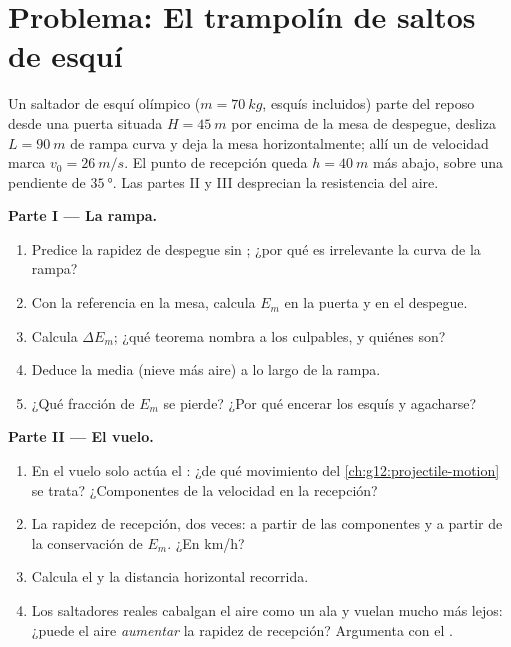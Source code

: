 \section{Problema: El trampolín de saltos de esquí}

\begin{problem}
\label{pb:g12:work-and-energy:1}
Un saltador de esquí olímpico ($m = \qty{70}{kg}$, esquís incluidos) parte del reposo
desde una puerta situada $H = \qty{45}{m}$ por encima de la mesa de despegue, desliza
$L = \qty{90}{m}$ de rampa curva y deja la mesa horizontalmente; allí un  de
velocidad marca $v_0 = \qty{26}{m/s}$. El punto de recepción queda $h = \qty{40}{m}$
más abajo, sobre una pendiente de $\qty{35}{\degree}$. Las partes II y III desprecian
la resistencia del aire.

\medskip\noindent\textbf{Parte I --- La rampa.}
\begin{enumerate}
  \item Predice la rapidez de despegue sin ; ¿por qué es irrelevante la
        curva de la rampa?
  \item Con la referencia en la mesa, calcula $E_m$ en la puerta y en el despegue.
  \item Calcula $\Delta E_m$; ¿qué teorema nombra a los culpables, y quiénes son?
  \item Deduce la   media (nieve más aire) a lo largo de la rampa.
  \item ¿Qué fracción de $E_m$ se pierde? ¿Por qué encerar los esquís y agacharse?
\end{enumerate}

\medskip\noindent\textbf{Parte II --- El vuelo.}
\begin{enumerate}[resume]
  \item En el vuelo solo actúa el : ¿de qué movimiento del
        \cref{ch:g12:projectile-motion} se trata? ¿Componentes de la velocidad en la
        recepción?
  \item La rapidez de recepción, dos veces: a partir de las componentes y a partir de
        la conservación de $E_m$. ¿En \unit{km/h}?
  \item Calcula el  y la distancia horizontal recorrida.
  \item Los saltadores reales cabalgan el aire como un ala y vuelan mucho más lejos:
        ¿puede el aire \emph{aumentar} la rapidez de recepción? Argumenta con el
        .
\end{enumerate}


\end{problem}
